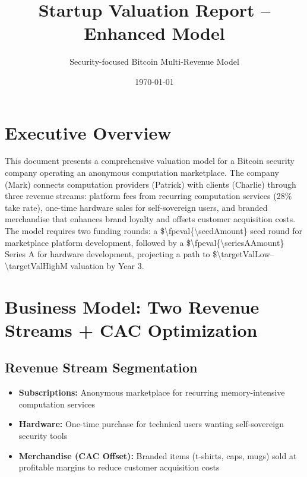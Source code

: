 \documentclass[11pt]{article}
\newcommand{\numint}[1]{\num[round-precision=0]{\fpeval{#1}}}
\begin{document}
\title{Startup Valuation Report -- Enhanced Model}
\author{Security-focused Bitcoin Multi-Revenue Model}
\date{\today}
\maketitle

\section*{Executive Overview}
This document presents a comprehensive valuation model for a Bitcoin security company operating an anonymous computation marketplace. The company (Mark) connects computation providers (Patrick) with clients (Charlie) through three revenue streams: platform fees from recurring computation services (28\% take rate), one-time hardware sales for self-sovereign users, and branded merchandise that enhances brand loyalty and offsets customer acquisition costs. The model requires two funding rounds: a \$\numint{\seedAmount} seed round for marketplace platform development, followed by a \$\numint{\seriesAAmount} Series A for hardware development, projecting a path to \$\num{\targetValLow}--\num{\targetValHigh}M valuation by Year 3.

\section{Business Model: Two Revenue Streams + CAC Optimization}

\subsection{Revenue Stream Segmentation}
\begin{itemize}
  \item \textbf{Subscriptions:} Anonymous marketplace for recurring memory-intensive computation services
  \item \textbf{Hardware:} One-time purchase for technical users wanting self-sovereign security tools
  \item \textbf{Merchandise (CAC Offset):} Branded items (t-shirts, caps, mugs) sold at profitable margins to reduce customer acquisition costs
\end{itemize}
\end{document}

